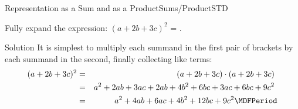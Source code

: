 \begin{MXContent}{Representation as a Sum and as a Product}{Sums/Product}{STD}
\begin{MExercise}
Fully expand the expression: $(a+2b+3c)^2$ = .

\begin{MHint}{Solution}
It is simplest to multiply each summand in the first pair of brackets by each summand in the second, 
finally collecting like terms:
\begin{eqnarray*}
(a+2b+3c)^2 & = & (a+2b+3c)\cdot(a+2b+3c)  \ \\
&=& a^2+2a b+3a c+2a b+4b^2+6b c+3a c+6b c+9c^2 \ \\
&=& a^2 +4a b+6a c+4b^2+12b c+9c^2 \MDFPeriod 
\end{eqnarray*}
\end{MHint}
\end{MExercise}

\end{MXContent}


